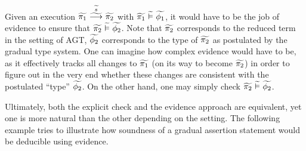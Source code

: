 Given an execution $\gsstepConsume{\grad{s}}{\grad{\pi_1}}{\grad{\pi_2}}$ with $\evalgphiGen{\grad{\pi_1}}{\grad{\phi_1}}$, it would have to be the job of evidence to ensure that $\evalgphiGen{\grad{\pi_2}}{\grad{\phi_2}}$.
Note that $\grad{\pi_2}$ corresponds to the reduced term in the setting of AGT, $\grad{\phi_2}$ corresponds to the type of $\grad{\pi_2}$ as postulated by the gradual type system.
One can imagine how complex evidence would have to be, as it effectively tracks all changes to $\grad{\pi_1}$ (on its way to become $\grad{\pi_2}$) in order to figure out in the very end whether these changes are consistent with the postulated “type” $\grad{\phi_2}$.
On the other hand, one may simply check $\evalgphiGen{\grad{\pi_2}}{\grad{\phi_2}}$.

Ultimately, both the explicit check and the evidence approach are equivalent, yet one is more natural than the other depending on the setting.
The following example tries to illustrate how soundness of a gradual assertion statement would be deducible using evidence.
